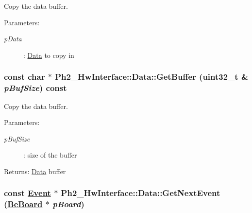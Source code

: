 Copy the data buffer. 

\begin{Desc}
\item[Parameters:]
\begin{description}
\item[{\em p\-Data}]: \hyperlink{class_ph2___hw_interface_1_1_data}{Data} to copy in \end{description}
\end{Desc}
\hypertarget{class_ph2___hw_interface_1_1_data_6093f26d20db6ca6a2a248b6bc8ddb25}{
\subsubsection[GetBuffer]{\setlength{\rightskip}{0pt plus 5cm}const char $\ast$ Ph2\_\-Hw\-Interface::Data::Get\-Buffer (uint32\_\-t \& {\em p\-Buf\-Size}) const}}
\label{class_ph2___hw_interface_1_1_data_6093f26d20db6ca6a2a248b6bc8ddb25}


Copy the data buffer. 

\begin{Desc}
\item[Parameters:]
\begin{description}
\item[{\em p\-Buf\-Size}]: size of the buffer \end{description}
\end{Desc}
\begin{Desc}
\item[Returns:]\hyperlink{class_ph2___hw_interface_1_1_data}{Data} buffer \end{Desc}
\hypertarget{class_ph2___hw_interface_1_1_data_1189154802fd46c30d22014a33426d65}{
\subsubsection[GetNextEvent]{\setlength{\rightskip}{0pt plus 5cm}const \hyperlink{class_ph2___hw_interface_1_1_event}{Event} $\ast$ Ph2\_\-Hw\-Interface::Data::Get\-Next\-Event (\hyperlink{class_ph2___hw_description_1_1_be_board}{Be\-Board} $\ast$ {\em p\-Board})}}
\label{class_ph2___hw_interface_1_1_data_1189154802fd46c30d22014a33426d65}


